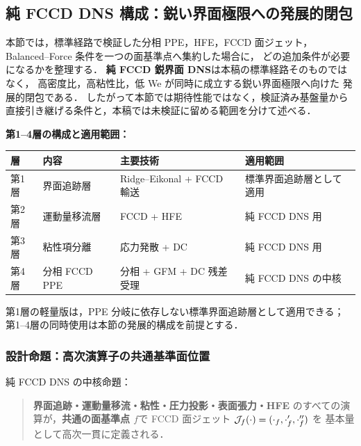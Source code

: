 %
%
\subsection{純 FCCD DNS 構成：鋭い界面極限への発展的閉包}
\label{sec:pure_fccd_dns}

本節では，標準経路で検証した分相 PPE，HFE，FCCD 面ジェット，
Balanced--Force 条件を一つの面基準点へ集約した場合に，
どの追加条件が必要になるかを整理する．
\textbf{純 FCCD 鋭界面 DNS}は本稿の標準経路そのものではなく，
高密度比，高粘性比，低 We が同時に成立する鋭い界面極限へ向けた
発展的閉包である．
したがって本節では期待性能ではなく，検証済み基盤量から
直接引き継げる条件と，本稿では未検証に留める範囲を分けて述べる．

\noindent\textbf{第1--4層の構成と適用範囲：}
\begin{center}
\small
\begin{tabular}{@{}llll@{}}
\hline
層 & 内容 & 主要技術 & 適用範囲 \\
\hline
第1層 & 界面追跡層 & Ridge--Eikonal + FCCD 輸送 & 標準界面追跡層として適用 \\
第2層 & 運動量移流層 & FCCD + HFE & 純 FCCD DNS 用 \\
第3層 & 粘性項分離 & 応力発散 + DC & 純 FCCD DNS 用 \\
第4層 & 分相 FCCD PPE & 分相 + GFM + DC 残差受理 & 純 FCCD DNS の中核 \\
\hline
\end{tabular}
\end{center}
第1層の軽量版は，PPE 分岐に依存しない標準界面追跡層として適用できる；
第1--4層の同時使用は本節の発展的構成を前提とする．

\subsubsection{設計命題：高次演算子の共通基準面位置}
\label{sec:pure_fccd_thesis}

純 FCCD DNS の中核命題：
\begin{quote}
\textbf{界面追跡・運動量移流・粘性・圧力投影・表面張力・HFE}
のすべての演算が，\textbf{共通の面基準点 $f$}で
FCCD 面ジェット $\mathcal{J}_{f}\!\left(\cdot\right)=(\cdot_f,\cdot'_f,\cdot''_f)$ を
基本量として高次一貫に定義される．
\end{quote}


